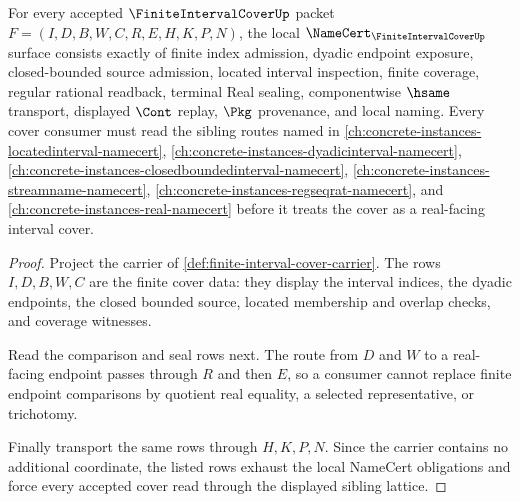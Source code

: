 \begin{theorem}
\label{thm:finite-interval-cover-namecert-obligations}
For every accepted $\FiniteIntervalCoverUp$ packet $F=(I,D,B,W,C,R,E,H,K,P,N)$, the local $\NameCert_{\FiniteIntervalCoverUp}$ surface consists exactly of finite index admission, dyadic endpoint exposure, closed-bounded source admission, located interval inspection, finite coverage, regular rational readback, terminal Real sealing, componentwise $\hsame$ transport, displayed $\Cont$ replay, $\Pkg$ provenance, and local naming. Every cover consumer must read the sibling routes named in \autoref{ch:concrete-instances-locatedinterval-namecert}, \autoref{ch:concrete-instances-dyadicinterval-namecert}, \autoref{ch:concrete-instances-closedboundedinterval-namecert}, \autoref{ch:concrete-instances-streamname-namecert}, \autoref{ch:concrete-instances-regseqrat-namecert}, and \autoref{ch:concrete-instances-real-namecert} before it treats the cover as a real-facing interval cover.
\end{theorem}
\begin{proof}
Project the carrier of \autoref{def:finite-interval-cover-carrier}. The rows $I,D,B,W,C$ are the finite cover data: they display the interval indices, the dyadic endpoints, the closed bounded source, located membership and overlap checks, and coverage witnesses.

Read the comparison and seal rows next. The route from $D$ and $W$ to a real-facing endpoint passes through $R$ and then $E$, so a consumer cannot replace finite endpoint comparisons by quotient real equality, a selected representative, or trichotomy.

Finally transport the same rows through $H,K,P,N$. Since the carrier contains no additional coordinate, the listed rows exhaust the local NameCert obligations and force every accepted cover read through the displayed sibling lattice.
\end{proof}

